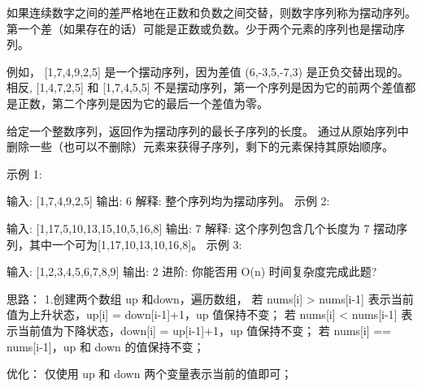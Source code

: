 如果连续数字之间的差严格地在正数和负数之间交替，则数字序列称为摆动序列。第一个差（如果存在的话）可能是正数或负数。少于两个元素的序列也是摆动序列。

例如， [1,7,4,9,2,5] 是一个摆动序列，因为差值 (6,-3,5,-7,3) 是正负交替出现的。相反, [1,4,7,2,5] 和 [1,7,4,5,5] 不是摆动序列，第一个序列是因为它的前两个差值都是正数，第二个序列是因为它的最后一个差值为零。

给定一个整数序列，返回作为摆动序列的最长子序列的长度。 通过从原始序列中删除一些（也可以不删除）元素来获得子序列，剩下的元素保持其原始顺序。

示例 1:

输入: [1,7,4,9,2,5]
输出: 6 
解释: 整个序列均为摆动序列。
示例 2:

输入: [1,17,5,10,13,15,10,5,16,8]
输出: 7
解释: 这个序列包含几个长度为 7 摆动序列，其中一个可为[1,17,10,13,10,16,8]。
示例 3:

输入: [1,2,3,4,5,6,7,8,9]
输出: 2
进阶:
你能否用 O(n) 时间复杂度完成此题?



































思路：
1.创建两个数组 up 和down，遍历数组，
若 nums[i] > nums[i-1] 表示当前值为上升状态，up[i] = down[i-1]+1，up 值保持不变；
若 nums[i] < nums[i-1] 表示当前值为下降状态，down[i] = up[i-1]+1，up 值保持不变；
若 nums[i] == nums[i-1]，up 和 down 的值保持不变；


优化：
仅使用 up 和 down 两个变量表示当前的值即可；



























